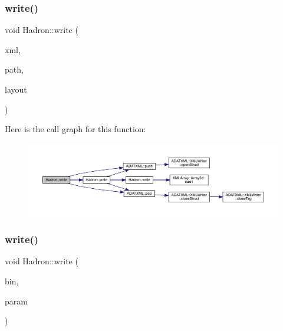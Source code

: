 \subsubsection{\texorpdfstring{write()}{write()}\hspace{0.1cm}{\footnotesize\ttfamily [7/95]}}
{\footnotesize\ttfamily void Hadron\+::write (\begin{DoxyParamCaption}\item[{\mbox{\hyperlink{classADATXML_1_1XMLWriter}{X\+M\+L\+Writer}} \&}]{xml,  }\item[{const std\+::string \&}]{path,  }\item[{const \mbox{\hyperlink{structHadron_1_1Layout_1_1Layout__t}{Layout\+::\+Layout\+\_\+t}} \&}]{layout }\end{DoxyParamCaption})}

Here is the call graph for this function\+:\nopagebreak
\begin{figure}[H]
\begin{center}
\leavevmode
\includegraphics[width=350pt]{d1/daf/namespaceHadron_ae327bbb04efa053f7be135b73bb596a7_cgraph}
\end{center}
\end{figure}
\mbox{\label{namespaceHadron_a0051134178fb8346e89720a478b8a8f1}} 
\subsubsection{\texorpdfstring{write()}{write()}\hspace{0.1cm}{\footnotesize\ttfamily [8/95]}}
{\footnotesize\ttfamily void Hadron\+::write (\begin{DoxyParamCaption}\item[{\mbox{\hyperlink{classADATIO_1_1BinaryWriter}{Binary\+Writer}} \&}]{bin,  }\item[{const \mbox{\hyperlink{structHadron_1_1HadronNptType__t}{Hadron\+Npt\+Type\+\_\+t}} \&}]{param }\end{DoxyParamCaption})}

